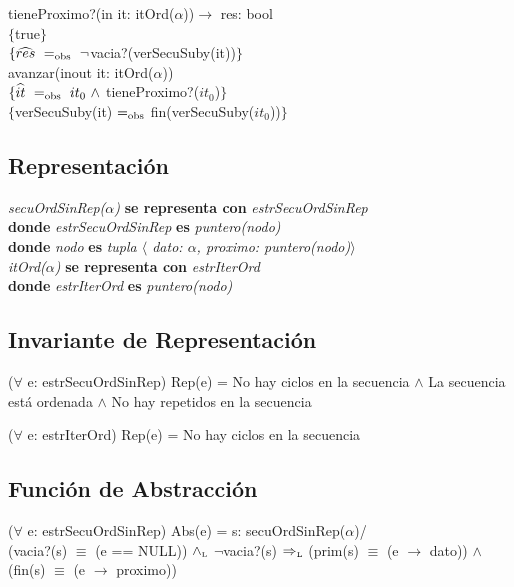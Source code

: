 tieneProximo?(in it: itOrd($\alpha$))$\longrightarrow$ res: bool\\
$\{$true$\}$\\
$\{\widehat{res}\ \igobs\ \neg$vacia?(verSecuSuby(it))$\}$\\

avanzar(inout it: itOrd($\alpha$))\\
$\{\widehat{it}\ =_{\mathrm{obs}}\ it_0\ \wedge$ tieneProximo?($it_0$)$\}$\\
$\{$verSecuSuby(it) $=_{\mathrm{obs}}$ fin(verSecuSuby($it_0$))$\}$\\


\subsection*{Representaci\'on}
\textit{secuOrdSinRep($\alpha$)} \textbf{se representa con} \textit{estrSecuOrdSinRep}\\
\textbf{donde} \textit{estrSecuOrdSinRep} \textbf{es} \textit{puntero(nodo)}\\
\textbf{donde} \textit{nodo} \textbf{es} \textit{tupla $\langle$ dato: $\alpha$, proximo: puntero(nodo)$\rangle$}\\

\textit{itOrd($\alpha$)} \textbf{se representa con} \textit{estrIterOrd}\\
\textbf{donde} \textit{estrIterOrd} \textbf{es} \textit{puntero(nodo)}\\

\subsection*{Invariante de Representaci\'on}
\vspace{11pt}
($\forall$ e: estrSecuOrdSinRep) Rep(e) = No hay ciclos en la secuencia $\wedge$ La secuencia est\'a ordenada $\wedge$ No hay repetidos en la secuencia

\vspace{22pt}

\vspace{11pt}
($\forall$ e: estrIterOrd) Rep(e) = No hay ciclos en la secuencia

\vspace{33pt}

\subsection*{Funci\'on de Abstracci\'on}
\vspace{11pt}
($\forall$ e: estrSecuOrdSinRep) Abs(e) = s: secuOrdSinRep($\alpha$)/\\
(vacia?(s) $\equiv$ (e == NULL)) $\land_{\mathrm{\scriptscriptstyle{L}}}$ $\neg$vacia?(s) $\Rightarrow_{\mathrm{\scriptscriptstyle{L}}}$ (prim(s) $\equiv$ (e $\rightarrow$ dato)) $\wedge$ (fin(s) $\equiv$ (e $\rightarrow$ proximo))

